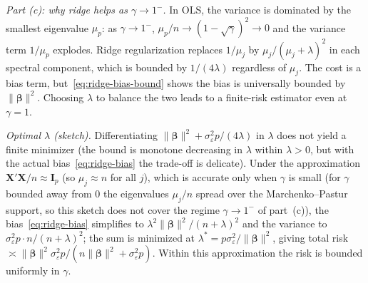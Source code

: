 \documentclass[12pt,a4paper]{article}
\theoremstyle{definition}
\newcommand{\bX}{\mathbf{X}}
\def\bb{\boldsymbol{\beta}}
\newcommand{\bI}{\mathbf{I}}
\begin{document}
\emph{Part (c): why ridge helps as $\gamma \to 1^-$.} In OLS, the variance is dominated by the smallest eigenvalue $\mu_p$: as $\gamma \to 1^-$, $\mu_p/n \to (1-\sqrt\gamma)^2 \to 0$ and the variance term $1/\mu_p$ explodes. Ridge regularization replaces $1/\mu_j$ by $\mu_j/(\mu_j + \lambda)^2$ in each spectral component, which is bounded by $1/(4\lambda)$ regardless of $\mu_j$. The cost is a bias term, but~\eqref{eq:ridge-bias-bound} shows the bias is universally bounded by $\|\bb\|^2$. Choosing $\lambda$ to balance the two leads to a finite-risk estimator even at $\gamma = 1$.

\emph{Optimal $\lambda$ (sketch).} Differentiating $\|\bb\|^2 + \sigma_\varepsilon^2 p/(4\lambda)$ in $\lambda$ does not yield a finite minimizer (the bound is monotone decreasing in $\lambda$ within $\lambda > 0$, but with the actual bias~\eqref{eq:ridge-bias} the trade-off is delicate). Under the approximation $\bX'\bX/n \approx \bI_p$ (so $\mu_j \approx n$ for all $j$), which is accurate only when $\gamma$ is small (for $\gamma$ bounded away from $0$ the eigenvalues $\mu_j/n$ spread over the Marchenko--Pastur support, so this sketch does not cover the regime $\gamma \to 1^-$ of part~(c)), the bias~\eqref{eq:ridge-bias} simplifies to $\lambda^2 \|\bb\|^2/(n+\lambda)^2$ and the variance to $\sigma_\varepsilon^2 p \cdot n/(n+\lambda)^2$; the sum is minimized at $\lambda^* = p\sigma_\varepsilon^2/\|\bb\|^2$, giving total risk $\asymp \|\bb\|^2\sigma_\varepsilon^2 p/(n\|\bb\|^2 + \sigma_\varepsilon^2 p)$. Within this approximation the risk is bounded uniformly in $\gamma$.
\end{document}
